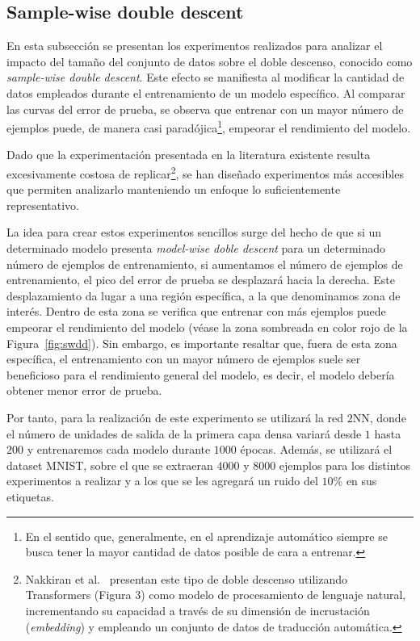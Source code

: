 \subsection{Sample-wise double descent}\label{subsec:sample-wise-dd}

En esta subsección se presentan los experimentos realizados para analizar el impacto del tamaño del conjunto de datos sobre el doble descenso, conocido como \textit{sample-wise double descent}. Este efecto se manifiesta al modificar la cantidad de datos empleados durante el entrenamiento de un modelo específico. Al comparar las curvas del error de prueba, se observa que entrenar con un mayor número de ejemplos puede, de manera casi paradójica\footnote{En el sentido que, generalmente, en el aprendizaje automático siempre se busca tener la mayor cantidad de datos posible de cara a entrenar.}, empeorar el rendimiento del modelo.\newline

Dado que la experimentación presentada en la literatura existente resulta excesivamente costosa de replicar\footnote{Nakkiran et al.~\cite{Nakkiran2019} presentan este tipo de doble descenso utilizando Transformers (Figura 3) como modelo de procesamiento de lenguaje natural, incrementando su capacidad a través de su dimensión de incrustación (\textit{embedding}) y empleando un conjunto de datos de traducción automática.}, se han diseñado experimentos más accesibles que permiten analizarlo manteniendo un enfoque lo suficientemente representativo.\newline

La idea para crear estos experimentos sencillos surge del hecho de que si un determinado modelo presenta \textit{model-wise doble descent} para un determinado número de ejemplos de entrenamiento, si aumentamos el número de ejemplos de entrenamiento, el pico del error de prueba se desplazará hacia la derecha. Este desplazamiento da lugar a una región específica, a la que denominamos zona de interés. Dentro de esta zona se verifica que entrenar con más ejemplos puede empeorar el rendimiento del modelo (véase la zona sombreada en color rojo de la Figura~\ref{fig:swdd}). Sin embargo, es importante resaltar que, fuera de esta zona específica, el entrenamiento con un mayor número de ejemplos suele ser beneficioso para el rendimiento general del modelo, es decir, el modelo debería obtener menor error de prueba.\newline

Por tanto, para la realización de este experimento se utilizará la red $2$NN, donde el número de unidades de salida de la primera capa densa variará desde $1$ hasta $200$ y entrenaremos cada modelo durante $1000$ épocas. Además, se utilizará el dataset MNIST, sobre el que se extraeran $4000$ y $8000$ ejemplos para los distintos experimentos a realizar y a los que se les agregará un ruido del $10$\% en sus etiquetas.\newline

